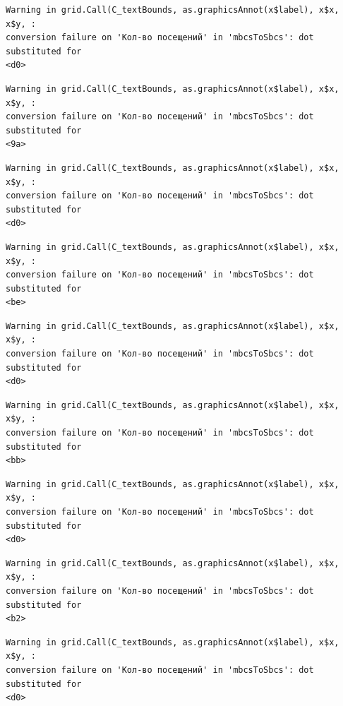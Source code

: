 \documentclass[
  letterpaper,
  DIV=11,
  numbers=noendperiod]{scrartcl}
\begin{document}
\begin{verbatim}
Warning in grid.Call(C_textBounds, as.graphicsAnnot(x$label), x$x, x$y, :
conversion failure on 'Кол-во посещений' in 'mbcsToSbcs': dot substituted for
<d0>
\end{verbatim}

\begin{verbatim}
Warning in grid.Call(C_textBounds, as.graphicsAnnot(x$label), x$x, x$y, :
conversion failure on 'Кол-во посещений' in 'mbcsToSbcs': dot substituted for
<9a>
\end{verbatim}

\begin{verbatim}
Warning in grid.Call(C_textBounds, as.graphicsAnnot(x$label), x$x, x$y, :
conversion failure on 'Кол-во посещений' in 'mbcsToSbcs': dot substituted for
<d0>
\end{verbatim}

\begin{verbatim}
Warning in grid.Call(C_textBounds, as.graphicsAnnot(x$label), x$x, x$y, :
conversion failure on 'Кол-во посещений' in 'mbcsToSbcs': dot substituted for
<be>
\end{verbatim}

\begin{verbatim}
Warning in grid.Call(C_textBounds, as.graphicsAnnot(x$label), x$x, x$y, :
conversion failure on 'Кол-во посещений' in 'mbcsToSbcs': dot substituted for
<d0>
\end{verbatim}

\begin{verbatim}
Warning in grid.Call(C_textBounds, as.graphicsAnnot(x$label), x$x, x$y, :
conversion failure on 'Кол-во посещений' in 'mbcsToSbcs': dot substituted for
<bb>
\end{verbatim}

\begin{verbatim}
Warning in grid.Call(C_textBounds, as.graphicsAnnot(x$label), x$x, x$y, :
conversion failure on 'Кол-во посещений' in 'mbcsToSbcs': dot substituted for
<d0>
\end{verbatim}

\begin{verbatim}
Warning in grid.Call(C_textBounds, as.graphicsAnnot(x$label), x$x, x$y, :
conversion failure on 'Кол-во посещений' in 'mbcsToSbcs': dot substituted for
<b2>
\end{verbatim}

\begin{verbatim}
Warning in grid.Call(C_textBounds, as.graphicsAnnot(x$label), x$x, x$y, :
conversion failure on 'Кол-во посещений' in 'mbcsToSbcs': dot substituted for
<d0>
\end{verbatim}
\end{document}
